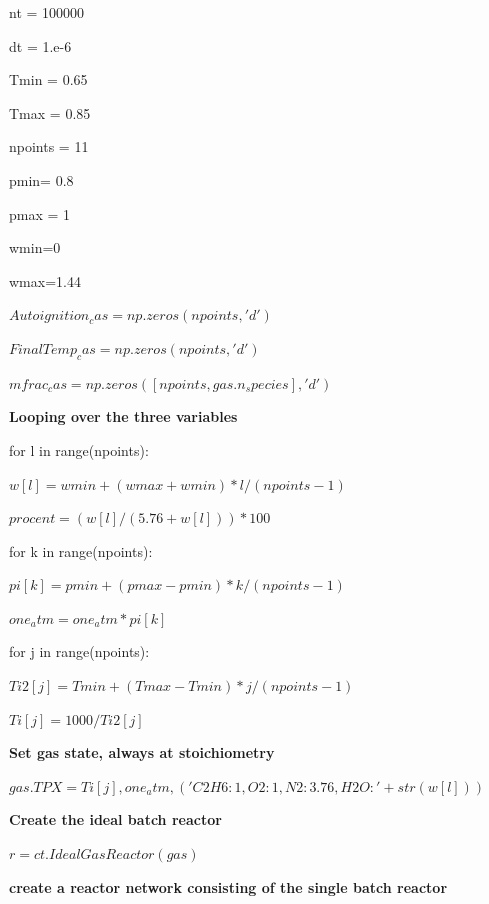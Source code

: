\documentclass[a4paper]{article}
\begin{document}
nt = 100000

dt = 1.e-6  

Tmin = 0.65

Tmax = 0.85

npoints = 11

pmin= 0.8

pmax = 1

wmin=0

wmax=1.44

$Autoignition_cas = np.zeros(npoints, 'd')$

$FinalTemp_cas = np.zeros(npoints, 'd')$

$mfrac_cas = np.zeros([npoints, gas.n_species], 'd')$

\textbf{Looping over the three variables}

for l in range(npoints):

\hspace{5,35mm}$w[l]= wmin + (wmax +wmin) * l / (npoints - 1)$
   
\hspace{5,35mm}$procent = (w[l]/(5.76+w[l]))*100$
   
\hspace{10,70mm}for k in range(npoints):
    
\hspace{10,70mm}$pi[k]= pmin +(pmax-pmin) * k / (npoints-1)$
        
\hspace{10,70mm}$one_atm= one_atm *pi[k]$
        
\hspace{10,70mm}for j in range(npoints):
        
\hspace{16,05mm}$Ti2[j] = Tmin + (Tmax - Tmin) * j / (npoints - 1)$

\hspace{16,05mm}$Ti[j] = 1000 / Ti2[j]$
            
\hspace{16,05mm} \textbf{Set gas state, always at stoichiometry} 
        
\hspace{16,05mm}$gas.TPX = Ti[j], one_atm, ('C2H6:1,O2:1,N2:3.76,H2O:'+str(w[l]))$
            
\hspace{16,05mm}\textbf {Create the ideal batch reactor}
       
\hspace{16,05mm}$r = ct.IdealGasReactor(gas)$
            
\hspace{16,05mm}\textbf{ create a reactor network consisting of the single batch reactor}
       
\end{document}
